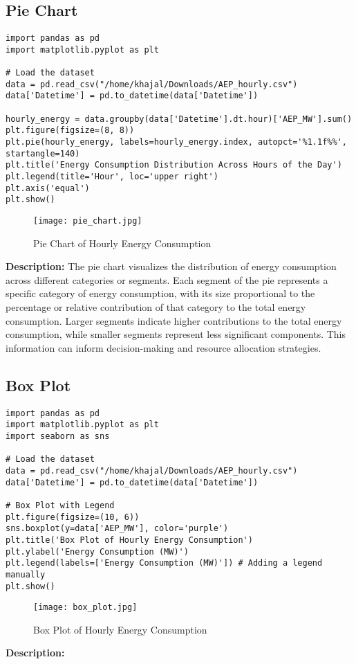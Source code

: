 \documentclass{article}
\begin{document}
\subsection{Pie Chart}
\begin{lstlisting}[caption={Python code for pie chart}]
import pandas as pd
import matplotlib.pyplot as plt

# Load the dataset
data = pd.read_csv("/home/khajal/Downloads/AEP_hourly.csv")
data['Datetime'] = pd.to_datetime(data['Datetime'])

hourly_energy = data.groupby(data['Datetime'].dt.hour)['AEP_MW'].sum()
plt.figure(figsize=(8, 8))
plt.pie(hourly_energy, labels=hourly_energy.index, autopct='%1.1f%%', startangle=140)
plt.title('Energy Consumption Distribution Across Hours of the Day')
plt.legend(title='Hour', loc='upper right')
plt.axis('equal')
plt.show()
\end{lstlisting}
\begin{figure}[H]
    \centering
    \texttt{[image: pie\_chart.jpg]}
    \caption{Pie Chart of Hourly Energy Consumption}
    \label{fig:PieChart}
\end{figure}
\textbf{Description:}
The pie chart visualizes the distribution of energy consumption across different categories or segments. Each segment of the pie represents a specific category of energy consumption, with its size proportional to the percentage or relative contribution of that category to the total energy consumption.
 Larger segments indicate higher contributions to the total energy consumption, while smaller segments represent less significant components. This information can inform decision-making and resource allocation strategies.
\subsection{ Box Plot}
\begin{lstlisting}[caption={Python code for Boxplot}]
import pandas as pd
import matplotlib.pyplot as plt
import seaborn as sns

# Load the dataset
data = pd.read_csv("/home/khajal/Downloads/AEP_hourly.csv")
data['Datetime'] = pd.to_datetime(data['Datetime'])

# Box Plot with Legend
plt.figure(figsize=(10, 6))
sns.boxplot(y=data['AEP_MW'], color='purple')
plt.title('Box Plot of Hourly Energy Consumption')
plt.ylabel('Energy Consumption (MW)')
plt.legend(labels=['Energy Consumption (MW)']) # Adding a legend manually
plt.show()
\end{lstlisting}
\begin{figure}[H]
    \centering
    \texttt{[image: box\_plot.jpg]}
    \caption{Box Plot of Hourly Energy Consumption}
    \label{fig:BoxPlot}
\end{figure}
\textbf{Description:}
\end{document}
